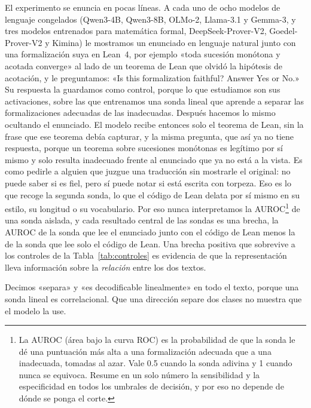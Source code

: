 \documentclass[10pt]{article}
\begin{document}
El experimento se enuncia en pocas líneas. A cada uno de ocho modelos de lenguaje congelados (Qwen3-4B, Qwen3-8B,
OLMo-2, Llama-3.1 y Gemma-3, y tres modelos entrenados para matemática formal, DeepSeek-Prover-V2, Goedel-Prover-V2 y
Kimina) le mostramos un enunciado en lenguaje natural junto con una formalización suya en Lean~4, por ejemplo «toda
sucesión monótona y acotada converge» al lado de un teorema de Lean que olvidó la hipótesis de acotación, y le
preguntamos: «Is this formalization faithful? Answer Yes or No.» Su respuesta la guardamos como control, porque lo que
estudiamos son sus activaciones, sobre las que entrenamos una sonda lineal que aprende a separar las formalizaciones
adecuadas de las inadecuadas. Después hacemos lo mismo ocultando el enunciado. El modelo recibe entonces solo el
teorema de Lean, sin la frase que ese teorema debía capturar, y la misma pregunta, que así ya no tiene respuesta,
porque un teorema sobre sucesiones monótonas es legítimo por sí mismo y solo resulta inadecuado frente al enunciado
que ya no está a la vista. Es como pedirle a alguien que juzgue una traducción sin mostrarle el original: no puede
saber si es fiel, pero sí puede notar si está escrita con torpeza. Eso es lo que recoge la segunda sonda, lo que el
código de Lean delata por sí mismo en su estilo, su longitud o su vocabulario. Por eso nunca interpretamos la
AUROC\footnote{La AUROC (área bajo la curva ROC) es la probabilidad de que la sonda le dé una puntuación más alta a
una formalización adecuada que a una inadecuada, tomadas al azar. Vale 0.5 cuando la sonda adivina y 1 cuando nunca se
equivoca. Resume en un solo número la sensibilidad y la especificidad en todos los umbrales de decisión, y por eso no
depende de dónde se ponga el corte.} de una sonda aislada, y cada resultado central de las sondas es una brecha, la
AUROC de la sonda que lee el enunciado junto con el código de Lean menos la de la sonda que lee solo el código de
Lean. Una brecha positiva que sobrevive a los controles de la Tabla~\ref{tab:controles} es evidencia de que la
representación lleva información sobre la \emph{relación} entre los dos textos.

Decimos «separa» y «es decodificable linealmente» en todo el texto, porque una sonda lineal es correlacional. Que
una dirección separe dos clases no muestra que el modelo la use.
\end{document}
